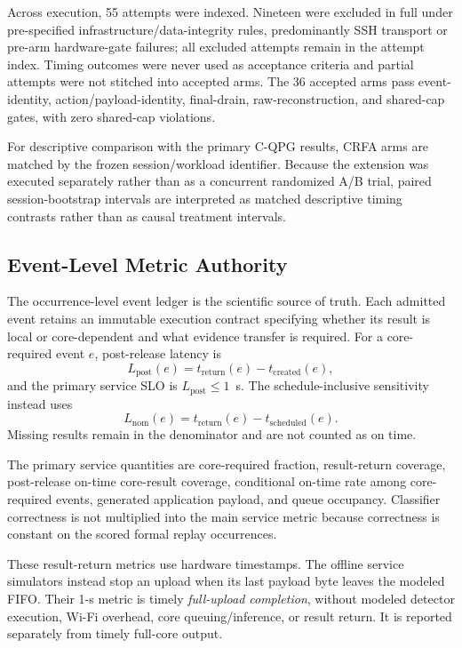 \documentclass[10pt,journal]{IEEEtran}
\newcommand{\CQPG}{\textsc{C-QPG}}
\newcommand{\CRFA}{\textsc{CRFA}}
\begin{document}
Across execution, 55 attempts were indexed. Nineteen were excluded in full
under pre-specified infrastructure/data-integrity rules, predominantly SSH
transport or pre-arm hardware-gate failures; all excluded attempts remain in
the attempt index. Timing outcomes were never used as acceptance criteria and
partial attempts were not stitched into accepted arms. The 36 accepted arms
pass event-identity, action/payload-identity, final-drain, raw-reconstruction,
and shared-cap gates, with zero shared-cap violations.

For descriptive comparison with the primary \CQPG{} results, \CRFA{} arms are
matched by the frozen session/workload identifier. Because the extension was
executed separately rather than as a concurrent randomized A/B trial, paired
session-bootstrap intervals are interpreted as matched descriptive timing
contrasts rather than as causal treatment intervals.

\subsection{Event-Level Metric Authority}
The occurrence-level event ledger is the scientific source of truth. Each
admitted event retains an immutable execution contract specifying whether its
result is local or core-dependent and what evidence transfer is required.
For a core-required event $e$, post-release latency is
\begin{equation}
L_{\mathrm{post}}(e)=t_{\mathrm{return}}(e)-t_{\mathrm{created}}(e),
\label{eq:postlat}
\end{equation}
and the primary service SLO is $L_{\mathrm{post}}\leq1$~s. The
schedule-inclusive sensitivity instead uses
\begin{equation}
L_{\mathrm{nom}}(e)=t_{\mathrm{return}}(e)-t_{\mathrm{scheduled}}(e).
\label{eq:nomlat}
\end{equation}
Missing results remain in the denominator and are not counted as on time.

The primary service quantities are core-required fraction, result-return
coverage, post-release on-time core-result coverage, conditional on-time rate
among core-required events, generated application payload, and queue
occupancy. Classifier correctness is not multiplied into the main service
metric because correctness is constant on the scored formal replay
occurrences.

These result-return metrics use hardware timestamps. The offline service
simulators instead stop an upload when its last payload byte leaves the
modeled FIFO. Their 1-s metric is timely \emph{full-upload completion},
without modeled detector execution, Wi-Fi overhead, core queuing/inference,
or result return. It is reported separately from timely full-core output.
\end{document}
